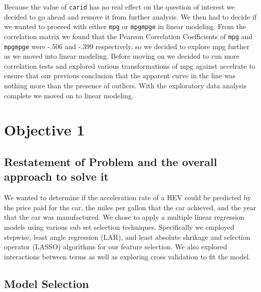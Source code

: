 \documentclass[acmsmall]{acmart}
\begin{document}
Because the value of \texttt{carid} has no real effect on the question of interest we decided to go ahead and remove it from further analysis. We then had to decide if we wanted to proceed with either \texttt{mpg} or \texttt{mpgmpge} in linear modeling. From the correlation matrix we found that the Pearson Correlation Coefficients of \texttt{mpg} and \texttt{mpgmpge} were -.506 and -.399 respectively, so we decided to explore mpg further as we moved into linear modeling. Before moving on we decided to run more correlation tests and explored various transformations of mpg against accelrate to ensure that our previous conclusion that the apparent curve in the line was nothing more than the presence of outliers. With the exploratory data analysis complete we moved on to linear modeling. 

\section{Objective 1}
\subsection{Restatement of Problem and the overall approach to solve it}
We wanted to determine if the acceleration rate of a HEV could be predicted by the price paid for the car, the miles per gallon that the car achieved, and the year that the car was manufactured. We chose to apply a multiple linear regression models using various sub set selection techniques. Specifically we employed stepwise, least angle regression (LAR), and least absolute shrikage and selection operator (LASSO) algorithms for our feature selection.  We also explored interactions between terms as well as exploring cross validation to fit the model.
\subsection{Model Selection}
\end{document}
